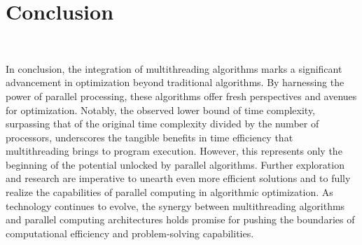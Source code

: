 \section{Conclusion}~\label{sec.Conclusion}

In conclusion, the integration of multithreading algorithms marks a significant advancement in optimization beyond traditional algorithms. By harnessing the power of parallel processing, these algorithms offer fresh perspectives and avenues for optimization. Notably, the observed lower bound of time complexity, surpassing that of the original time complexity divided by the number of processors, underscores the tangible benefits in time efficiency that multithreading brings to program execution. However, this represents only the beginning of the potential unlocked by parallel algorithms. Further exploration and research are imperative to unearth even more efficient solutions and to fully realize the capabilities of parallel computing in algorithmic optimization. As technology continues to evolve, the synergy between multithreading algorithms and parallel computing architectures holds promise for pushing the boundaries of computational efficiency and problem-solving capabilities.

